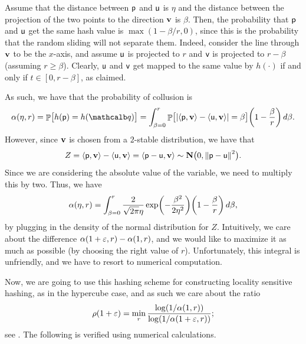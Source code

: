 Assume that the distance between $\mathsf{p}$ and $\mathsf{u}$ is $\eta$ and the
distance between the projection of the two points to the direction
$\mathbf{v}$ is $\beta$. Then, the probability that $\mathsf{p}$ and $\mathsf{u}$ get
the same hash value is $\max( 1-\beta/r, 0 )$, since this is the
probability that the random sliding will not separate them.  Indeed,
consider the line through $\mathbf{v}$ to be the $x$-axis, and assume
$\mathsf{u}$ is projected to $r$ and $\mathsf{v}$ is projected to $r- \beta$
(assuming $r \geq \beta$).  Clearly, $\mathsf{u}$ and $\mathsf{v}$ get mapped to
the same value by $h(\cdot)$ if and only if $t \in [0,r-\beta]$, as
claimed.

As such, we have that the probability of collusion is
\begin{align*}
  \alpha(\eta, r)%
  =%
  \Prob{ \bigl. h(\pnt) = h(\query) } %
  =%
  \int_{\beta=0}^{r}%
  \Prob{\bigl. \cardin{ \DotProd{\pnt}{\vecA} -
  \DotProd{\pntA}{\vecA}} = \beta} \pth[]{ 1-
  \frac{\beta}{r}} \, d\beta.
\end{align*}
However, since $\mathbf{v}$ is chosen from a $2$-stable distribution, we
have that
\begin{equation*}
    Z%
    =%
    \DotProd{\pnt}{\vecA} - \DotProd{\pntA}{\vecA}%
    =%
    \DotProd{\pnt - \pntA}{\vecA}%
    \sim%
    \NormalDistOneDim\bigl( 0, \distY{\pnt}{\pntA}^2 \bigr).
\end{equation*}
 Since we are considering the absolute
value of the variable, we need to multiply this by two.  Thus, we have
\begin{align*}
    \alpha(\eta, r)%
    =%
    \int_{\beta=0}^{r} \frac{2}{\sqrt{2 \pi} \eta} \exp\pth{ -
       \frac{\beta^2}{2\eta^2}}\pth[]{ 1 - \frac{\beta}{r}} \, d\beta,
\end{align*}
by plugging in the density of the normal distribution for $Z$.
Intuitively, we care about the difference $\alpha( 1+{\varepsilon},r )
-\alpha(1,r)$, and we would like to maximize it as much as possible
(by choosing the right value of $r$). Unfortunately, this integral is
unfriendly, and we have to resort to numerical computation.
%


Now, we are going to use this hashing scheme for constructing locality
sensitive hashing, as in the hypercube case, and as such we care about
the ratio
\begin{align*}
    \rho(1+\eps)%
    =%
    \min_{r} \frac{\log (1/\alpha(1, r))}{\log (1/\alpha(1+\eps,r))};
\end{align*}
see .  The following is verified using numerical
calculations.


